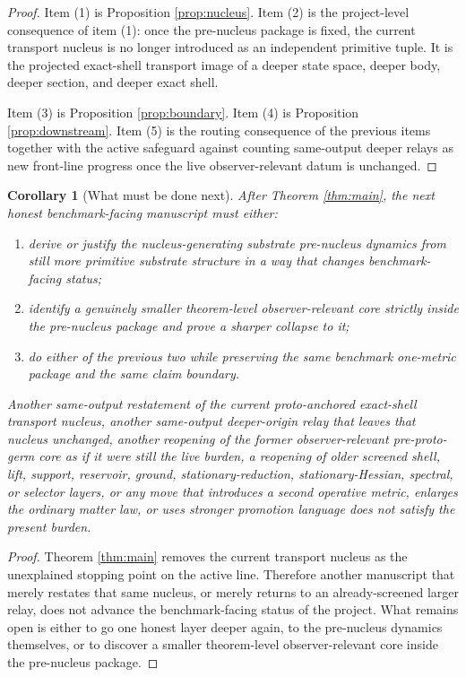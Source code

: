 \documentclass[11pt]{article}
\newtheorem{corollary}{Corollary}
\begin{document}
\begin{proof}
Item (1) is Proposition \ref{prop:nucleus}. Item (2) is the project-level consequence of item (1): once the pre-nucleus package is fixed, the current transport nucleus is no longer introduced as an independent primitive tuple. It is the projected exact-shell transport image of a deeper state space, deeper body, deeper section, and deeper exact shell.

Item (3) is Proposition \ref{prop:boundary}. Item (4) is Proposition \ref{prop:downstream}. Item (5) is the routing consequence of the previous items together with the active safeguard against counting same-output deeper relays as new front-line progress once the live observer-relevant datum is unchanged.
\end{proof}

\begin{corollary}[What must be done next]
\label{cor:next}
After Theorem \ref{thm:main}, the next honest benchmark-facing manuscript must either:
\begin{enumerate}
    \item derive or justify the nucleus-generating substrate pre-nucleus dynamics from still more primitive substrate structure in a way that changes benchmark-facing status;
    \item identify a genuinely smaller theorem-level observer-relevant core strictly inside the pre-nucleus package and prove a sharper collapse to it;
    \item do either of the previous two while preserving the same benchmark one-metric package and the same claim boundary.
\end{enumerate}
Another same-output restatement of the current proto-anchored exact-shell transport nucleus, another same-output deeper-origin relay that leaves that nucleus unchanged, another reopening of the former observer-relevant pre-proto-germ core as if it were still the live burden, a reopening of older screened shell, lift, support, reservoir, ground, stationary-reduction, stationary-Hessian, spectral, or selector layers, or any move that introduces a second operative metric, enlarges the ordinary matter law, or uses stronger promotion language does not satisfy the present burden.
\end{corollary}

\begin{proof}
Theorem \ref{thm:main} removes the current transport nucleus as the unexplained stopping point on the active line. Therefore another manuscript that merely restates that same nucleus, or merely returns to an already-screened larger relay, does not advance the benchmark-facing status of the project. What remains open is either to go one honest layer deeper again, to the pre-nucleus dynamics themselves, or to discover a smaller theorem-level observer-relevant core inside the pre-nucleus package.
\end{proof}
\end{document}
